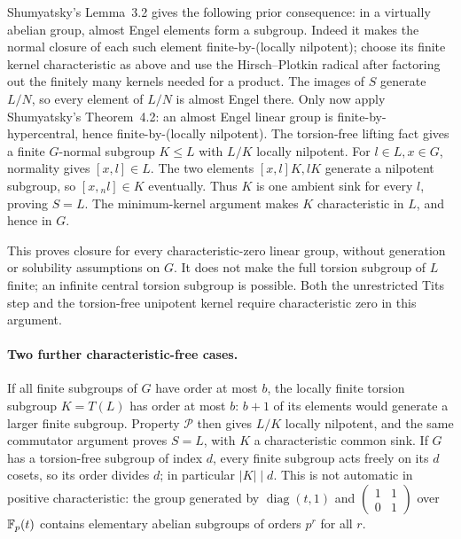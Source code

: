 Shumyatsky's Lemma~3.2 gives the following prior consequence:
in a virtually abelian group, almost Engel elements form a
subgroup. Indeed it makes the normal closure of each such element
finite-by-(locally nilpotent); choose its finite kernel characteristic
as above and use the Hirsch--Plotkin radical after factoring out
the finitely many kernels needed for a product.
The images of \(S\) generate \(L/N\), so every element of \(L/N\)
is almost Engel there. Only now apply Shumyatsky's Theorem~4.2:
an almost Engel linear group is finite-by-hypercentral,
hence finite-by-(locally nilpotent).
The torsion-free lifting fact gives a finite \(G\)-normal
subgroup \(K\le L\) with \(L/K\) locally nilpotent.
For \(l\in L,x\in G\), normality gives \([x,l]\in L\).
The two elements \([x,l]K,lK\) generate a nilpotent subgroup,
so \([x,{}_n l]\in K\) eventually. Thus \(K\) is one ambient
sink for every \(l\), proving \(S=L\).
The minimum-kernel argument makes \(K\) characteristic in \(L\),
and hence in \(G\).

This proves closure for every characteristic-zero linear group,
without generation or solubility assumptions on \(G\).
It does not make the full torsion subgroup of \(L\) finite;
an infinite central torsion subgroup is possible.
Both the unrestricted Tits step and the torsion-free unipotent
kernel require characteristic zero in this argument.

\paragraph{Two further characteristic-free cases.}
If all finite subgroups of \(G\) have order at most \(b\),
the locally finite torsion subgroup \(K=T(L)\) has order at
most \(b\): \(b+1\) of its elements would generate a larger
finite subgroup. Property \(\mathcal P\) then gives \(L/K\)
locally nilpotent, and the same commutator argument proves
\(S=L\), with \(K\) a characteristic common sink.
If \(G\) has a torsion-free subgroup of index \(d\), every
finite subgroup acts freely on its \(d\) cosets, so its order
divides \(d\); in particular \(|K|\mid d\).
This is not automatic in positive characteristic: the group
generated by \(\operatorname{diag}(t,1)\) and
\(\left(\begin{smallmatrix}1&1\\0&1\end{smallmatrix}\right)\)
over \(\mathbb F_p(t)\) contains elementary abelian subgroups of
orders \(p^r\) for all \(r\).

